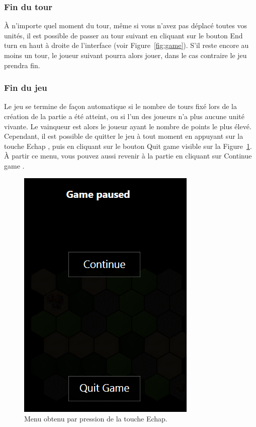 \subsubsection{Fin du tour}

À n'importe quel moment du tour, même si vous n'avez pas déplacé toutes vos unités, il est possible de passer au tour suivant en cliquant sur le bouton \og End turn \fg{} en haut à droite de l'interface (voir {\sc Figure}~\ref{fig:game}). S'il reste encore au moins un tour, le joueur suivant pourra alors jouer, dans le cas contraire le jeu prendra fin.

\subsubsection{Fin du jeu}

Le jeu se termine de façon automatique si le nombre de tours fixé lors de la création de la partie a été atteint, ou si l'un des joueurs n'a plus aucune unité vivante. Le vainqueur est alors le joueur ayant le nombre de points le plus élevé. Cependant, il est possible de quitter le jeu à tout moment en appuyant sur la touche \og Echap \fg{}, puis en cliquant sur le bouton \og Quit game \fg{} visible sur la {\sc Figure}~\ref{fig:echap}. À partir ce menu, vous pouvez aussi revenir à la partie en cliquant sur \og Continue game \fg{}.

\begin{figure}
    \centering
    \includegraphics[height=0.60\textwidth]{figure/echap.png}
    \caption{Menu obtenu par pression de la touche Echap.}
    \label{fig:echap}
\end{figure}